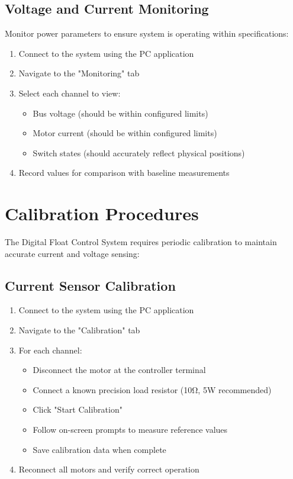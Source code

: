 \documentclass[12pt,a4paper,twoside,openright]{book}
\begin{document}
\subsection{Voltage and Current Monitoring}

Monitor power parameters to ensure system is operating within specifications:

\begin{enumerate}
    \item Connect to the system using the PC application
    \item Navigate to the "Monitoring" tab
    \item Select each channel to view:
    \begin{itemize}
        \item Bus voltage (should be within configured limits)
        \item Motor current (should be within configured limits)
        \item Switch states (should accurately reflect physical positions)
    \end{itemize}
    \item Record values for comparison with baseline measurements
\end{enumerate}

\section{Calibration Procedures}

The Digital Float Control System requires periodic calibration to maintain accurate current and voltage sensing:

\subsection{Current Sensor Calibration}

\begin{enumerate}
    \item Connect to the system using the PC application
    \item Navigate to the "Calibration" tab
    \item For each channel:
    \begin{itemize}
        \item Disconnect the motor at the controller terminal
        \item Connect a known precision load resistor (10Ω, 5W recommended)
        \item Click "Start Calibration"
        \item Follow on-screen prompts to measure reference values
        \item Save calibration data when complete
    \end{itemize}
    \item Reconnect all motors and verify correct operation
\end{enumerate}
\end{document}
